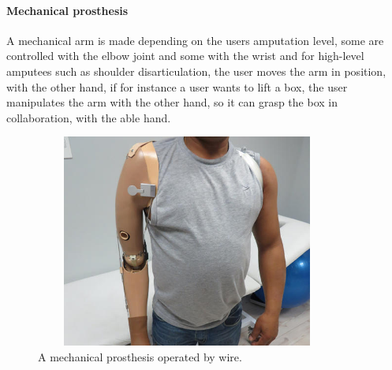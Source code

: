 \paragraph{Mechanical prosthesis}
A mechanical arm is made depending on the users amputation level, some are controlled with the elbow joint and some with the wrist and for high-level amputees such as shoulder disarticulation, the user moves the arm in position, with the other hand, if for instance a user wants to lift a box, the user manipulates the arm with the other hand, so it can grasp the box in collaboration, with the able hand. 
\begin{figure}[H]
    \centering
    \includegraphics[width=10cm,height=7cm]{Figures/Contextual_figures/ProsthesesPics/above-elbow-prosthesis-500x500.jpg}
    \caption{A mechanical prosthesis operated by wire\cite{AEP}.}
    \label{fig:AEP}
\end{figure}
